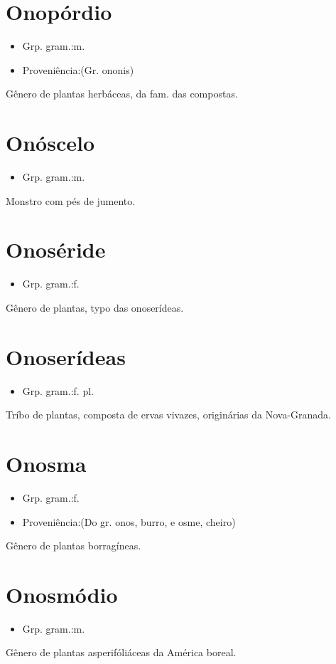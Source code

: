 \section{Onopórdio}
\begin{itemize}
\item {Grp. gram.:m.}
\end{itemize}
\begin{itemize}
\item {Proveniência:(Gr. \textunderscore ononis\textunderscore )}
\end{itemize}
Gênero de plantas herbáceas, da fam. das compostas.
\section{Onóscelo}
\begin{itemize}
\item {Grp. gram.:m.}
\end{itemize}
Monstro com pés de jumento.
\section{Onoséride}
\begin{itemize}
\item {Grp. gram.:f.}
\end{itemize}
Gênero de plantas, typo das onoserídeas.
\section{Onoserídeas}
\begin{itemize}
\item {Grp. gram.:f. pl.}
\end{itemize}
Tríbo de plantas, composta de ervas vivazes, originárias da Nova-Granada.
\section{Onosma}
\begin{itemize}
\item {Grp. gram.:f.}
\end{itemize}
\begin{itemize}
\item {Proveniência:(Do gr. \textunderscore onos\textunderscore , burro, e \textunderscore osme\textunderscore , cheiro)}
\end{itemize}
Gênero de plantas borragíneas.
\section{Onosmódio}
\begin{itemize}
\item {Grp. gram.:m.}
\end{itemize}
Gênero de plantas asperifóliáceas da América boreal.
